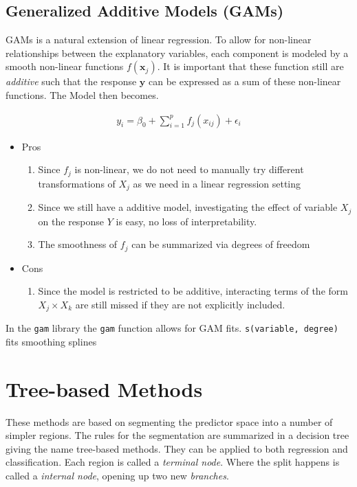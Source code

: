 \documentclass{article}
\renewcommand{\vec}[1]{\mathbf{#1}} %
\begin{document}
\subsection{Generalized Additive Models (GAMs)}
GAMs is a natural extension of linear regression. To allow for non-linear relationships between the explanatory variables, each component is modeled by a smooth non-linear functions $f(\vec{x}_j)$. It is important that these function still are \textit{additive} such that the response $\vec{y}$ can be expressed as a sum of these non-linear functions. The Model then becomes.

\begin{align*}
    y_i = \beta_0 + \sum_{i=1}^{p} f_j (x_{ij}) + \epsilon_i
\end{align*}

\begin{itemize}
    \item Pros
    \begin{enumerate}
        \item Since $f_j$ is non-linear, we do not need to manually try different transformations of $X_j$ as we need in a linear regression setting
        \item Since we still have a additive model, investigating the effect of variable $X_j$ on the response $Y$ is easy, no loss of interpretability.
        \item The smoothness of $f_j$ can be summarized via degrees of freedom
    \end{enumerate}
    \item Cons
    \begin{enumerate}
        \item Since the model is restricted to be additive, interacting terms of the form $X_j \times X_k$ are still missed if they are not explicitly included. 
    \end{enumerate}
\end{itemize}

In the \texttt{gam} library the \texttt{gam} function allows for GAM fits. \texttt{s(variable, degree)} fits smoothing splines

\section{Tree-based Methods}
These methods are based on segmenting the predictor space into a number of simpler regions. The rules for the segmentation are summarized in a decision tree giving the name tree-based methods. They can be applied to both regression and classification.
Each region is called a \textit{terminal node}. Where the split happens is called  a \textit{internal node}, opening up two new \textit{branches}.
\end{document}
